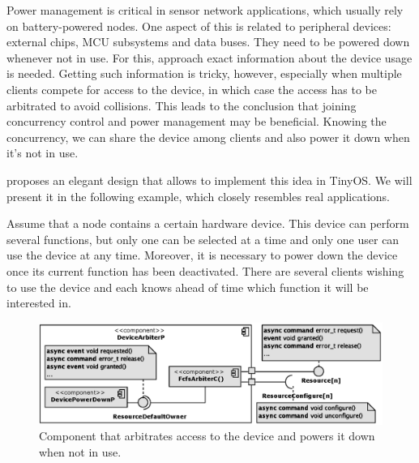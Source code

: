 Power management is critical in sensor network applications, which usually rely on battery-powered nodes. One aspect of this is related to peripheral devices: external chips, MCU subsystems and data buses. They need to be powered down whenever not in use. For this, approach exact information about the device usage is needed.  Getting such information is tricky, however, especially when multiple clients compete for access to the device, in which case the access has to be arbitrated to avoid collisions.  This leads to the conclusion that joining concurrency control and power management may be beneficial. Knowing the concurrency, we can share the device among clients and also power it down when it's not in use.

\cite{Klues et al.} proposes an elegant design that allows to implement this idea in TinyOS. We will present it in the following example, which closely resembles real applications.

Assume that a node contains a certain hardware device. This device can perform several functions, but only one can be selected at a time and only one user can use the device at any time. Moreover, it is necessary to power down the device once its current function has been deactivated. There are several clients wishing to use the device and each knows ahead of time which function it will be interested in.
\begin{figure}[h]
  \centering
  \includegraphics[width=1.0\textwidth]{diagrams/devicearbiterp.eps}
  \caption{Component that arbitrates access to the device and powers
  it down when not in use.}
  \label{fig:devicearbiterp}
\end{figure}

